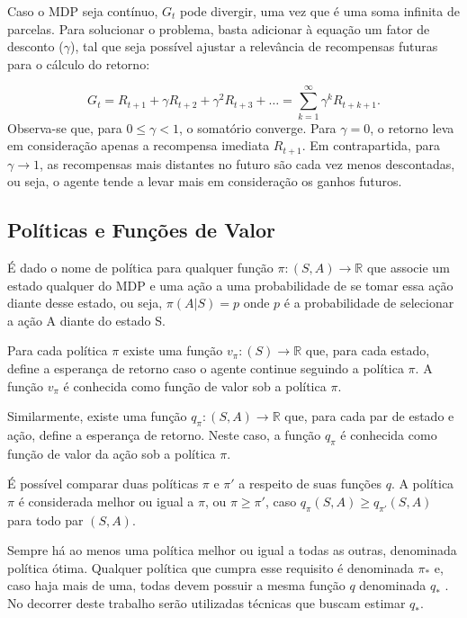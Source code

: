 Caso o MDP seja contínuo, $G_t$ pode divergir, uma vez que é uma soma infinita de parcelas. Para solucionar o problema, basta adicionar à equação um fator de desconto ($\gamma$), tal que seja possível ajustar a relevância de recompensas futuras para o cálculo do retorno:

\begin{equation}
	G_{t} = R_{t+1} + \gamma R_{t+2} + \gamma^2 R_{t+3} + \dotsc = \sum_{k=1}^{\infty} \gamma^k R_{t+k+1}.
\end{equation}
% 
Observa-se que, para $ 0 \leq \gamma < 1$, o somatório converge. Para $\gamma = 0$, o retorno leva em consideração apenas a recompensa imediata $R_{t+1}$. Em contrapartida, para $\gamma \to 1$, as recompensas mais distantes no futuro são cada vez menos descontadas, ou seja, o agente tende a levar mais em consideração os ganhos futuros.

\subsection{Políticas e Funções de Valor}

É dado o nome de política para qualquer função $\pi: (S, A) \to \mathbb{R}$ que associe um estado qualquer do MDP e uma ação a uma probabilidade de se tomar essa ação diante desse estado, ou seja, $\pi(A|S) = p$ onde $p$ é a probabilidade de selecionar a ação A diante do estado S.

Para cada política $\pi$ existe uma função $v_\pi: (S) \to \mathbb{R}$ que, para cada estado, define a esperança de retorno caso o agente continue seguindo a política $\pi$. A função $v_\pi$ é conhecida como função de valor sob a política $\pi$.

Similarmente, existe uma função $q_\pi: (S, A) \to \mathbb{R}$ que, para cada par de estado e ação, define a esperança de retorno. Neste caso, a função $q_\pi$ é conhecida como função de valor da ação sob a política $\pi$.

É possível comparar duas políticas $\pi$ e $\pi'$ a respeito de suas funções $q$. A política $\pi$ é considerada melhor ou igual a $\pi$, ou $\pi \ge \pi'$, caso $q_\pi(S, A) \ge q_{\pi'}(S, A)$ para todo par $(S, A)$.

Sempre há ao menos uma política melhor ou igual a todas as outras, denominada política ótima. Qualquer política que cumpra esse requisito é denominada $\pi_*$ e, caso haja mais de uma, todas devem possuir a mesma função $q$ denominada $q_*$ \cite{sutton2018reinforcement}. No decorrer deste trabalho serão utilizadas técnicas que buscam estimar $q_*$. %

